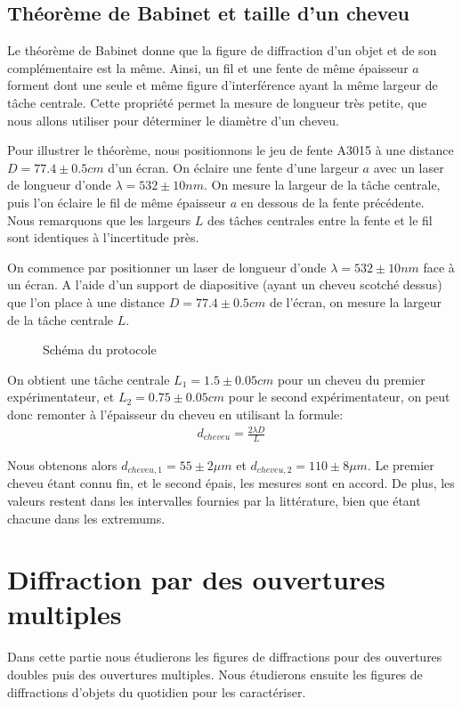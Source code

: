 \documentclass[12pt]{article}
\begin{document}
\subsection{Théorème de Babinet et taille d'un cheveu}
Le théorème de Babinet donne que la figure de diffraction d'un objet et de son complémentaire est la même.
Ainsi, un fil et une fente de même épaisseur $a$ forment dont une seule et même figure d'interférence ayant la même largeur de tâche centrale. Cette propriété permet la mesure de longueur très petite, que nous allons utiliser
pour déterminer le diamètre d'un cheveu.

Pour illustrer le théorème, nous positionnons le jeu de fente A3015 à une distance $D = 77.4 \pm 0.5 cm$ d'un écran. 
On éclaire une fente d'une largeur $a$ avec un laser de longueur d'onde $\lambda = 532 \pm 10nm$. On mesure la largeur de la tâche centrale, puis l'on éclaire le fil de même épaisseur $a$ en dessous de la fente précédente.
Nous remarquons que les largeurs $L$ des tâches centrales entre la fente et le fil sont identiques à l'incertitude près.

On commence par positionner un laser de longueur d'onde $\lambda = 532 \pm 10 nm$ face à un écran. A l'aide d'un support de diapositive (ayant un cheveu scotché dessus) que l'on place à une distance $D = 77.4 \pm 0.5 cm$ de
l'écran, on mesure la largeur de la tâche centrale $L$. 

\begin{figure}[!h]
    \begin{center}
        \resizebox{0.6\textwidth}{8cm}{
        
        }
    \end{center}
    \caption{Schéma du protocole}
\end{figure}

On obtient une tâche centrale $L_1 = 1.5 \pm 0.05cm$ pour un cheveu du premier expérimentateur, et $L_2 = 0.75 \pm 0.05cm$ pour le second expérimentateur, on peut donc remonter à l'épaisseur du cheveu en utilisant la formule:
\begin{align}
    d_{cheveu} = \frac{2 \lambda D}{L}
\end{align}

Nous obtenons alors $d_{cheveu,1} = 55 \pm 2 \mu m$ et $d_{cheveu,2} = 110 \pm 8 \mu m$. Le premier cheveu étant connu fin, et le second épais, les mesures sont en accord. De plus, les valeurs restent dans les intervalles
fournies par la littérature, bien que étant chacune dans les extremums.
\section{Diffraction par des ouvertures multiples}
Dans cette partie nous étudierons les figures de diffractions pour des ouvertures doubles puis des ouvertures multiples. Nous étudierons ensuite les figures de diffractions d'objets du quotidien pour les caractériser. 
\end{document}
